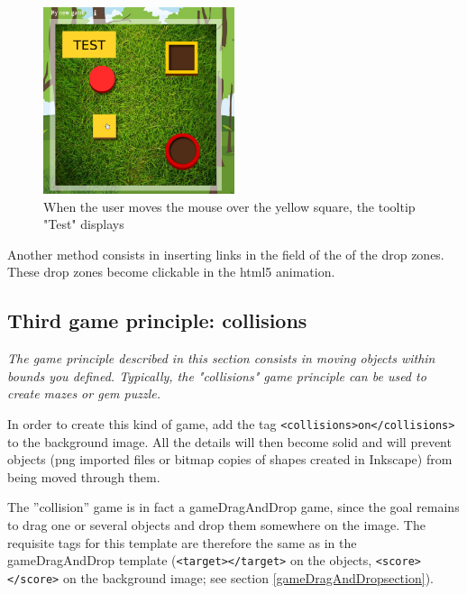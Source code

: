 \begin{figure}[htp]
 \centering
 \includegraphics[width=0.5\textwidth]{images/tooltip_example}
 \caption{When the user moves the mouse over the yellow square, the tooltip "Test" displays}
 \label{tooltip_example}
\end{figure}

Another method consists in inserting links in the  field of the  
of the drop zones. These drop zones become clickable in the html5 animation.

\subsection{Third game principle: collisions}

\textit{The game principle described in this section consists in moving objects
within bounds you defined. Typically, the "collisions" game principle
can be used to create mazes or gem puzzle.}




In order to create this kind of game, add the tag \verb|<collisions>on</collisions>| to the 
background image. All the details will then become solid and will prevent objects 
(png imported files or bitmap copies of shapes created in Inkscape) from being moved through them.

The ''collision'' game is in fact a gameDragAndDrop game, since the goal remains to 
drag one or several objects and drop them somewhere on the image.
The requisite tags for this template are 
therefore the same as in the gameDragAndDrop template (\verb|<target></target>| on the objects, \verb|<score></score>| 
on the background image; see section \ref{gameDragAndDropsection}).
\newpage
